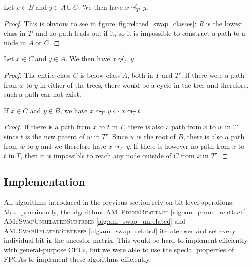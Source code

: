 \begin{lemma}
    \label{lem:related_swap_bac}
    Let $x \in B$ and $y \in A \cup C$. We then have $x \not\leadsto_{T'} y$.
\end{lemma}

\begin{proof}
    This is obvious to see in figure \ref{fig:related_swap_classes}: $B$ is the lowest class in $T'$ and no path leads out if it, so it is impossible to construct a path to a node in $A$ or $C$.
\end{proof}

\begin{lemma}
    \label{lem:related_swap_ca}
    Let $x \in C$ and $y \in A$. We then have $x \not\leadsto_{T'} y$.
\end{lemma}

\begin{proof}
    The entire class $C$ is below class $A$, both in $T$ and $T'$. If there were a path from $x$ to $y$ in either of the trees, there would be a cycle in the tree and therefore, such a path can not exist.
\end{proof}

\begin{lemma}
    \label{lem:related_swap_cb}
    If $x \in C$ and $y \in B$, we have $x \leadsto_{T'} y \Leftrightarrow x \leadsto_T t$.
\end{lemma}

\begin{proof}
    If there is a path from $x$ to $t$ in $T$, there is also a path from $x$ to $w$ in $T'$ since $t$ is the new parent of $w$ in $T'$. Since $w$ is the root of $B$, there is also a path from $w$ to $y$ and we therefore have $x \leadsto_{T'} y$. If there is however no path from $x$ to $t$ in $T$, then it is impossible to reach any node outside of $C$ from $x$ in $T'$.
\end{proof}

\subsection{Implementation}
\label{sec:encoding_implementation}

All algorithms introduced in the previous section rely on bit-level operations. Most prominently, the algorithms \textsc{AM::PruneReattach} \ref{alg:am_prune_reattach}, \textsc{AM::SwapUnrelatedSubtrees} \ref{alg:am_swap_unrelated} and \textsc{AM::SwapRelatedSubtrees} \ref{alg:am_swap_related} iterate over and set every individual bit in the ancestor matrix. This would be hard to implement efficiently with general-purpose \acp{CPU}, but we were able to use the special properties of \acp{FPGA} to implement these algorithms efficiently.

